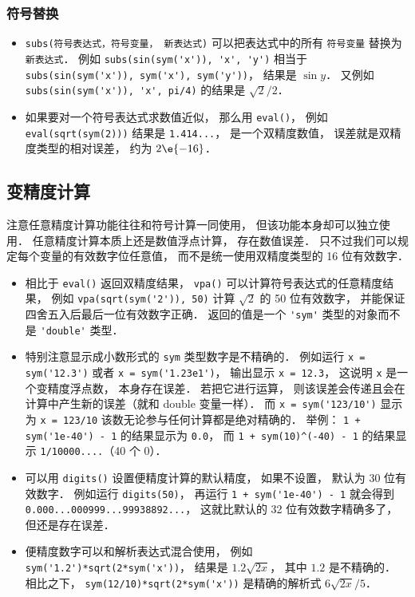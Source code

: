 \subsubsection{符号替换}
\begin{itemize}
\item \verb|subs(符号表达式，符号变量， 新表达式)| 可以把表达式中的所有 \verb|符号变量| 替换为 \verb|新表达式|． 例如 \verb|subs(sin(sym('x')), 'x', 'y')| 相当于 \verb|subs(sin(sym('x')), sym('x'), sym('y'))|， 结果是 $\sin y$． 又例如 \verb|subs(sin(sym('x')), 'x', pi/4)| 的结果是 $\sqrt 2/2$．
\item 如果要对一个符号表达式求数值近似， 那么用 \verb|eval()|， 例如 \verb|eval(sqrt(sym(2)))| 结果是 \verb|1.414...|， 是一个双精度数值， 误差就是双精度类型的相对误差， 约为 $2\e{-16}$．
\end{itemize}

\subsection{变精度计算}
注意任意精度计算功能往往和符号计算一同使用， 但该功能本身却可以独立使用． 任意精度计算本质上还是数值浮点计算， 存在数值误差． 只不过我们可以规定每个变量的有效数字位任意值， 而不是统一使用双精度类型的 16 位有效数字．

\begin{itemize}
\item 相比于 \verb|eval()| 返回双精度结果， \verb|vpa()| 可以计算符号表达式的任意精度结果， 例如 \verb|vpa(sqrt(sym('2')), 50)| 计算 $\sqrt{2}$ 的 50 位有效数字， 并能保证四舍五入后最后一位有效数字正确． 返回的值是一个 \verb|'sym'| 类型的对象而不是 \verb|'double'| 类型．
\item  特别注意显示成小数形式的 \verb|sym| 类型数字是不精确的． 例如运行 \verb|x = sym('12.3')| 或者 \verb|x = sym('1.23e1')|， 输出显示 \verb|x = 12.3|， 这说明 \verb|x| 是一个变精度浮点数， 本身存在误差． 若把它进行运算， 则该误差会传递且会在计算中产生新的误差（就和 double 变量一样）． 而 \verb|x = sym('123/10')| 显示为 \verb|x = 123/10| 该数无论参与任何计算都是绝对精确的． 举例： \verb|1 + sym('1e-40') - 1| 的结果显示为 \verb|0.0|， 而 \verb|1 + sym(10)^(-40) - 1| 的结果显示 \verb|1/10000....|（40 个 0）．
\item 可以用 \verb|digits()| 设置便精度计算的默认精度， 如果不设置， 默认为 30 位有效数字． 例如运行 \verb|digits(50)|， 再运行 \verb|1 + sym('1e-40') - 1| 就会得到 \verb|0.000...000999...99938892...|， 这就比默认的 32 位有效数字精确多了， 但还是存在误差．
\item 便精度数字可以和解析表达式混合使用， 例如 \verb|sym('1.2')*sqrt(2*sym('x'))|， 结果是 $1.2 \sqrt{2x}$， 其中 $1.2$ 是不精确的． 相比之下， \verb|sym(12/10)*sqrt(2*sym('x'))| 是精确的解析式 $6\sqrt{2x}/5$．
\end{itemize}


